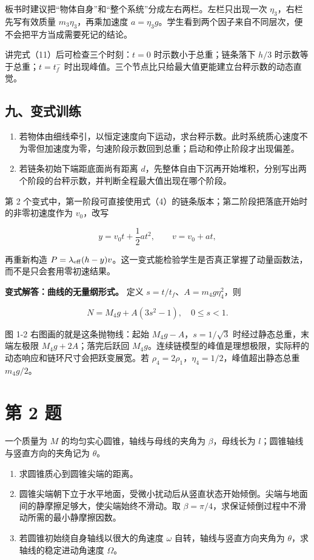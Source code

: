 \documentclass[12pt,a4paper,UTF8]{ctexart}
\newcommand{\tightlist}{\setlength{\itemsep}{0pt}\setlength{\parskip}{0pt}}
\begin{document}
板书时建议把``物体自身''和``整个系统''分成左右两栏。左栏只出现一次
\(\eta_3\)，右栏先写有效质量 \(m_3\eta_3\)，再乘加速度
\(a=\eta_3g\)。学生看到两个因子来自不同层次，便不会把平方当成需要死记的结论。

讲完式（11）后可检查三个时刻：\(t=0\) 时示数小于总重；链条落下 \(h/3\)
时示数等于总重；\(t=t_f^-\)
时出现峰值。三个节点比只给最大值更能建立台秤示数的动态直觉。

\subsection{九、变式训练}\label{ux4e5dux53d8ux5f0fux8badux7ec3}

\begin{enumerate}
\def\labelenumi{\arabic{enumi}.}
\tightlist
\item
  若物体由细线牵引，以恒定速度向下运动，求台秤示数。此时系统质心速度不为零但加速度为零，匀速阶段示数回到总重；启动和停止阶段才出现偏差。
\item
  若链条初始下端距底面尚有距离
  \(d\)，先整体自由下沉再开始堆积，分别写出两个阶段的台秤示数，并判断全程最大值出现在哪个阶段。
\end{enumerate}

第 2
个变式中，第一阶段可直接使用式（4）的链条版本；第二阶段把落底开始时的非零初速度作为
\(v_0\)，改写

\[y=v_0t+\frac12at^2,\qquad v=v_0+at,\]

再重新构造
\(P=\lambda_{\rm eff}(h-y)v\)。这一变式能检验学生是否真正掌握了动量函数法，而不是只会套用零初速结果。

\textbf{变式解答：曲线的无量纲形式。} 定义
\(s=t/t_f\)、\(A=m_4g\eta_4^2\)，则

\[N=M_4g+A(3s^2-1),\quad0\le s<1.\]

图 1-2 右图画的就是这条抛物线：起始 \(M_4g-A\)，\(s=1/\sqrt3\)
时经过静态总重，末端左极限 \(M_4g+2A\)；落完后跃回
\(M_4g\)。连续链模型的峰值是理想极限，实际秤的动态响应和链环尺寸会把跃变展宽。若
\(\rho_4=2\rho_1\)，\(\eta_4=1/2\)，峰值超出静态总重 \(m_4g/2\)。

\newpage

\section{第 2 题}\label{ux7b2c-2-ux9898}

一个质量为 \(M\) 的均匀实心圆锥，轴线与母线的夹角为 \(\beta\)，母线长为
\(l\)；圆锥轴线与竖直方向的夹角记为 \(\theta\)。

\begin{enumerate}
\def\labelenumi{\arabic{enumi}.}
\tightlist
\item
  求圆锥质心到圆锥尖端的距离。
\item
  圆锥尖端朝下立于水平地面，受微小扰动后从竖直状态开始倾倒。尖端与地面间的静摩擦足够大，使尖端始终不滑动。取
  \(\beta=\pi/4\)，求保证倾倒过程中不滑动所需的最小静摩擦因数。
\item
  若圆锥初始绕自身轴线以很大的角速度 \(\omega\)
  自转，轴线与竖直方向夹角为 \(\theta\)，求轴线的稳定进动角速度
  \(\Omega\)。
\end{enumerate}
\end{document}
